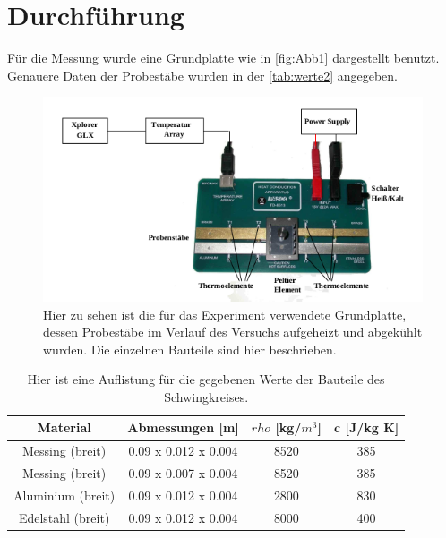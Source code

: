 \section{Durchführung}
\label{sec:Durchführung}

Für die Messung wurde eine Grundplatte wie in \autoref{fig:Abb1} dargestellt benutzt. Genauere Daten der Probestäbe wurden in der \autoref{tab:werte2} angegeben.

\begin{figure}
    \centering
    \includegraphics[scale=0.7]{content/Bilder/Aufbau.png}
    \caption{Hier zu sehen ist die für das Experiment verwendete Grundplatte, dessen Probestäbe im Verlauf des Versuchs aufgeheizt und abgekühlt wurden. Die einzelnen Bauteile sind hier beschrieben.}
    \label{fig:Abb1}
\end{figure}
\begin{table}
    \centering
    \caption{Hier ist eine Auflistung für die gegebenen Werte der Bauteile des Schwingkreises.}
    \label{tab:werte2}
    \begin{tabular}{c c c c}
        \toprule
        Material & Abmessungen [m] & \(rho\) [kg/$m^3$] & c [J/kg K] \\
        \midrule
            Messing (breit) & 0.09 x 0.012 x 0.004 & 8520 & 385 \\
            Messing (breit) & 0.09 x 0.007 x 0.004 & 8520 & 385 \\
            Aluminium (breit) & 0.09 x 0.012 x 0.004 & 2800 & 830 \\
            Edelstahl (breit) & 0.09 x 0.012 x 0.004 & 8000 & 400 \\
    \end{tabular}
  \end{table}

